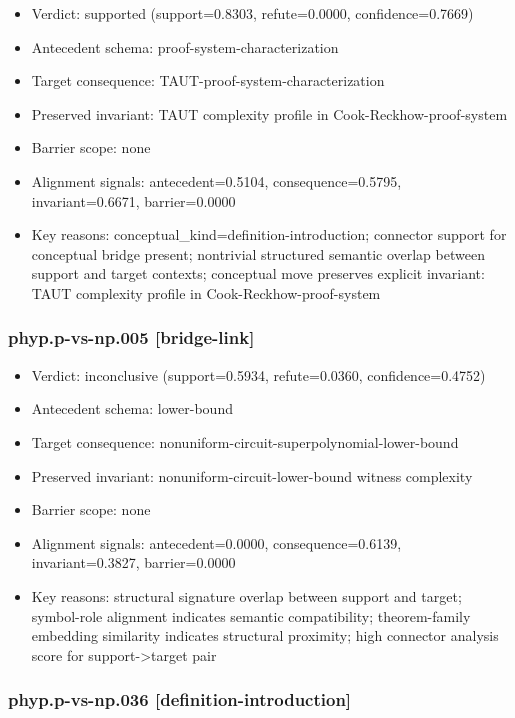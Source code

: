 \documentclass[
]{article}
\newcounter{none} %
\providecommand{\tightlist}{%
  \setlength{\itemsep}{0pt}\setlength{\parskip}{0pt}}
\begin{document}
\begin{itemize}
\tightlist
\item
  Verdict: supported (support=0.8303, refute=0.0000, confidence=0.7669)
\item
  Antecedent schema: proof-system-characterization
\item
  Target consequence: TAUT-proof-system-characterization
\item
  Preserved invariant: TAUT complexity profile in
  Cook-Reckhow-proof-system
\item
  Barrier scope: none
\item
  Alignment signals: antecedent=0.5104, consequence=0.5795,
  invariant=0.6671, barrier=0.0000
\item
  Key reasons: conceptual\_kind=definition-introduction; connector
  support for conceptual bridge present; nontrivial structured semantic
  overlap between support and target contexts; conceptual move preserves
  explicit invariant: TAUT complexity profile in
  Cook-Reckhow-proof-system
\end{itemize}

\subsubsection{phyp.p-vs-np.005
{[}bridge-link{]}}\label{phypp-vs-np005-bridge-link}

\begin{itemize}
\tightlist
\item
  Verdict: inconclusive (support=0.5934, refute=0.0360,
  confidence=0.4752)
\item
  Antecedent schema: lower-bound
\item
  Target consequence: nonuniform-circuit-superpolynomial-lower-bound
\item
  Preserved invariant: nonuniform-circuit-lower-bound witness complexity
\item
  Barrier scope: none
\item
  Alignment signals: antecedent=0.0000, consequence=0.6139,
  invariant=0.3827, barrier=0.0000
\item
  Key reasons: structural signature overlap between support and target;
  symbol-role alignment indicates semantic compatibility; theorem-family
  embedding similarity indicates structural proximity; high connector
  analysis score for support-\textgreater target pair
\end{itemize}

\subsubsection{phyp.p-vs-np.036
{[}definition-introduction{]}}\label{phypp-vs-np036-definition-introduction}
\end{document}

